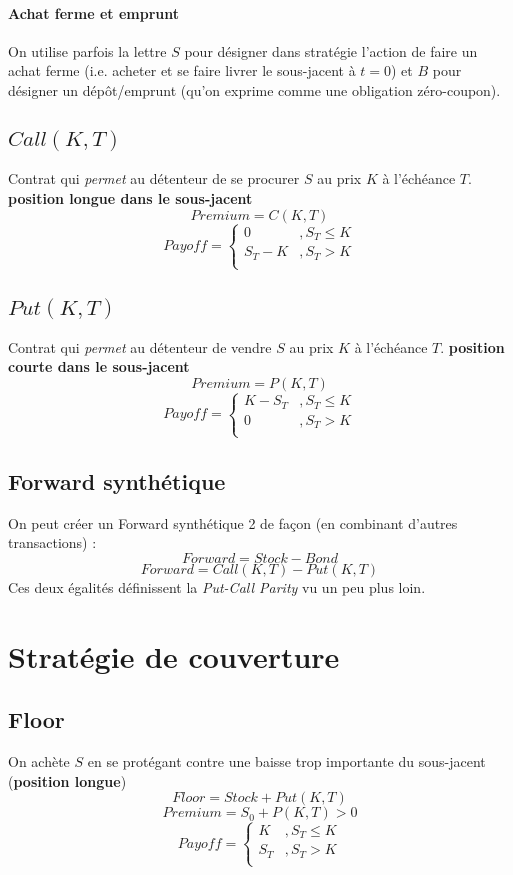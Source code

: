 \documentclass[10pt, french]{article}
\begin{document}
\begin{multicols*}{2}
\paragraph{Achat ferme et emprunt} On utilise parfois la lettre $S$ pour désigner dans stratégie l'action de faire un achat ferme (i.e. acheter et se faire livrer le sous-jacent à $t=0$) et $B$ pour désigner un dépôt/emprunt (qu'on exprime comme une obligation zéro-coupon).


\subsection*{$Call(K,T)$}
Contrat qui \textit{permet} au détenteur de se procurer $S$ au prix $K$ à l'échéance $T$. \textbf{position longue dans le sous-jacent}
\[Premium = C(K,T) \]
\[Payoff =
\begin{cases}
0				& , S_T \leq K \\
S_T - K		& , S_T > K \\
\end{cases}
\]



\subsection*{$Put(K,T)$}
Contrat qui \textit{permet} au détenteur de vendre $S$ au prix $K$ à l'échéance $T$. \textbf{position courte dans le sous-jacent}
\[Premium = P(K,T)\]
\[Payoff =
\begin{cases}
K - S_T			& , S_T \leq K \\
0					& , S_T > K \\
\end{cases}
\]


\subsection*{Forward synthétique}
On peut créer un Forward synthétique 2 de façon (en combinant d'autres transactions) :
\[Forward = Stock - Bond \]
\[Forward = Call(K,T) - Put(K,T) \]
Ces deux égalités définissent la \emph{Put-Call Parity} vu un peu plus loin.


\section{Stratégie de couverture}
\subsection*{Floor}
On achète $S$ en se protégant contre une baisse trop importante du sous-jacent (\textbf{position longue})
\[Floor = Stock + Put(K,T)\]
\[Premium = S_0 + P(K,T) > 0\]
\[Payoff =
\begin{cases}
K					& , S_T \leq K \\
S_T				& , S_T > K \\
\end{cases}
\]



\end{multicols*}
\end{document}
